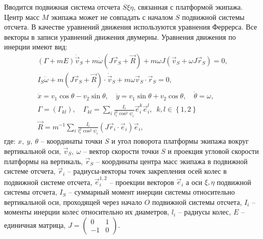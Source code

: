 Вводится подвижная система отсчета $S\xi\eta$, связанная с платформой экипажа. Центр масс $M$ экипажа может не совпадать с началом $S$ подвижной системы отсчета. В качестве уравнений движения используются уравнения Феррерса. Все векторы в записи уравнений движения двумерны. Уравнения движения по инерции имеют вид:
\begin{eqnarray}\label{eq:bor}
    (\Gamma+mE)\dot{\vec{v}}_S + m\dot{\omega}(J\vec{r}_S+\vec{R})+m\omega J(\vec{v}_S + \omega J\vec{r}_S) = 0,\\
    I_S\dot{\omega} + m(J\vec{r}_S+\vec{R})\cdot\dot{\vec{v}}_S+m\omega\vec{v}_S\cdot\vec{r}_S = 0,\\
    \dot{x} = v_1\cos\theta - v_2\sin\theta, \quad \dot{y} = v_1\sin\theta + v_2\cos\theta, \quad \dot{\theta} = \omega,\\
    \Gamma = \left( \Gamma_{kl} \right), \quad \Gamma_{kl} = \sum_i \frac{I_i}{l_i^2 \cos^2\psi_i}\vec{e}_i^k\vec{e}_i^l, \enspace k,l \in \left\{ 1, 2 \right\} \\
    \vec{R} = m^{-1}\sum_i \frac{I_i}{l_i^2 \cos^2\psi_i}(J\vec{r}_i\cdot \vec{e}_i) \vec{e}_i,
\end{eqnarray}
где: \newline
$x, \ y, \ \theta$ -- координаты точки $S$ и угол поворота платформы экипажа вокруг вертикальной оси,\newline
$\vec{v}_S, \ \omega$ -- вектор скорости точки $S$ и проекция угловой скорости платформы на вертикаль,\newline
$\vec{r}_S$ -- координаты центра масс экипажа в подвижной системе отсчета,\newline
$\vec{r}_i$ -- радиусы-векторы точек закрепления осей колес в подвижной системе отсчета,\newline
$\vec{e}_i^{1,2}$ -- проекции векторов $\vec{e}_i$ а оси $\xi,\eta$ подвижной системы отсчета,\newline
$I_S$ -- суммарный момент инерции системы относительно вертикальной оси, проходящей через начало $O$ подвижной системы отсчета,\newline
$I_i$ -- моменты инерции колес относительно их диаметров,\newline
$l_i$ -- радиусы колес,\newline
$E$ -- единичная матрица,
$J = \left(\begin{array}{cc}0 & 1\\-1 & 0\end{array}\right)$.

